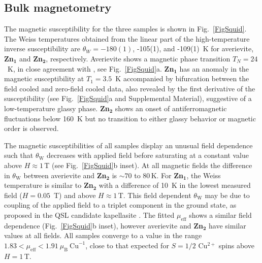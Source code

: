 \documentclass[
sn-nature,
Numbered,
iicol]
{sn-jnl}%
\newcommand{\uB}{\ensuremath{\mu_\textrm{B}}}
\begin{document}
 
 \subsection{Bulk magnetometry}
 
 The magnetic susceptibility for the three samples is shown in Fig.~\ref{FigSquid}. 
The Weiss temperatures obtained from the linear part of the high-temperature inverse susceptibility are $\theta_W= -180(1)$, -105(1), and -109(1)~K for averievite,  {\bf Zn$\mathbf {_1}$} and  {\bf Zn$\mathbf {_2}$}, respectively. 
Averievite shows a magnetic phase transition $T_N=24$~K, in close agreement with \cite{Botana2018}, see Fig.~\ref{FigSquid}a. 
 {\bf Zn$\mathbf {_1}$} has an anomaly in the magnetic susceptibility at $T_1=3.5$~K accompanied by bifurcation between the field cooled and zero-field cooled data, also revealed by the first derivative of the susceptibility (see Fig.~\ref{FigSquid}a and Supplemental Material), suggestive of a low-temperature glassy phase. 
 {\bf Zn$\mathbf {_2}$} shows an onset of antiferromagnetic fluctuations below 160~K but no transition to either glassy behavior or magnetic order is observed. 

The magnetic susceptibilities of all samples display an unusual field dependence such that $\theta_{\mathrm{W}}$ decreases with applied field before saturating at a constant value above $H \approx 1$\,T (see Fig.~\ref{FigSquid}b inset). 
At all magnetic fields the difference in $\theta_{\mathrm{W}}$ between averievite and  {\bf Zn$\mathbf {_2}$} is $\sim 70$ to 80\,K. For {\bf Zn$\mathbf {_1}$}, the Weiss temperature is similar to  {\bf Zn$\mathbf {_2}$} with a difference of 10~K in the lowest measured field ($H=0.05$~T) and above $H \approx 1$\,T. 
This field dependent $\theta_{\mathrm{W}}$ may be due to coupling of the applied field to a triplet component in the ground state, as proposed in the QSL candidate kapellasite \cite{Colman2008}. 
The fitted $\mu_{\mathrm{eff}}$ shows a similar field dependence (Fig.~\ref{FigSquid}b inset), however averievite and {\bf Zn$\mathbf {_2}$} have similar values at all fields. 
All samples converge to a value in the range $1.83 < \mu_{\mathrm{eff}} < 1.91~\uB~\mathrm{Cu}^{-1}$, close to that expected for $S = 1/2$ Cu$^{2+}$ spins above $H = 1$\,T. 
 
\end{document}
